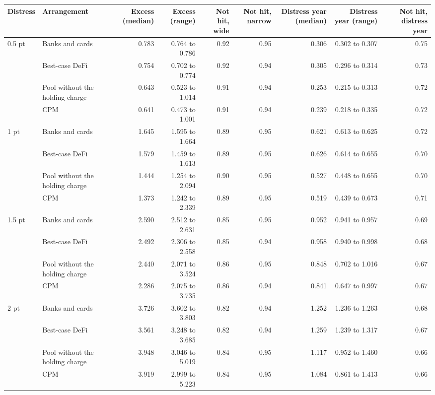 \begin{tabular}{llrrrrrrr}
\toprule
Distress & Arrangement & Excess (median) & Excess (range) & Not hit, wide & Not hit, narrow & Distress year (median) & Distress year (range) & Not hit, distress year \\
\midrule
0.5 pt & Banks and cards & 0.783 & 0.764 to 0.786 & 0.92 & 0.95 & 0.306 & 0.302 to 0.307 & 0.75 \\
 & Best-case DeFi & 0.754 & 0.702 to 0.774 & 0.92 & 0.94 & 0.305 & 0.296 to 0.314 & 0.73 \\
 & Pool without the holding charge & 0.643 & 0.523 to 1.014 & 0.91 & 0.94 & 0.253 & 0.215 to 0.313 & 0.72 \\
 & CPM & 0.641 & 0.473 to 1.001 & 0.91 & 0.94 & 0.239 & 0.218 to 0.335 & 0.72 \\
\midrule
1 pt & Banks and cards & 1.645 & 1.595 to 1.664 & 0.89 & 0.95 & 0.621 & 0.613 to 0.625 & 0.72 \\
 & Best-case DeFi & 1.579 & 1.459 to 1.613 & 0.89 & 0.95 & 0.626 & 0.614 to 0.655 & 0.70 \\
 & Pool without the holding charge & 1.444 & 1.254 to 2.094 & 0.90 & 0.95 & 0.527 & 0.448 to 0.655 & 0.70 \\
 & CPM & 1.373 & 1.242 to 2.339 & 0.89 & 0.95 & 0.519 & 0.439 to 0.673 & 0.71 \\
\midrule
1.5 pt & Banks and cards & 2.590 & 2.512 to 2.631 & 0.85 & 0.95 & 0.952 & 0.941 to 0.957 & 0.69 \\
 & Best-case DeFi & 2.492 & 2.306 to 2.558 & 0.85 & 0.94 & 0.958 & 0.940 to 0.998 & 0.68 \\
 & Pool without the holding charge & 2.440 & 2.071 to 3.524 & 0.86 & 0.95 & 0.848 & 0.702 to 1.016 & 0.67 \\
 & CPM & 2.286 & 2.075 to 3.735 & 0.86 & 0.94 & 0.841 & 0.647 to 0.997 & 0.67 \\
\midrule
2 pt & Banks and cards & 3.726 & 3.602 to 3.803 & 0.82 & 0.94 & 1.252 & 1.236 to 1.263 & 0.68 \\
 & Best-case DeFi & 3.561 & 3.248 to 3.685 & 0.82 & 0.94 & 1.259 & 1.239 to 1.317 & 0.67 \\
 & Pool without the holding charge & 3.948 & 3.046 to 5.019 & 0.84 & 0.95 & 1.117 & 0.952 to 1.460 & 0.66 \\
 & CPM & 3.919 & 2.999 to 5.223 & 0.84 & 0.95 & 1.084 & 0.861 to 1.413 & 0.66 \\
\bottomrule
\end{tabular}
